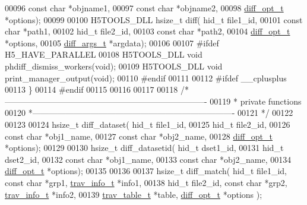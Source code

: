 \begin{DoxyCode}
00096                 \textcolor{keyword}{const} \textcolor{keywordtype}{char} *objname1,
00097                 \textcolor{keyword}{const} \textcolor{keywordtype}{char} *objname2,
00098                 \hyperlink{structdiff__opt__t}{diff\_opt\_t} *options);
00099 
00100 H5TOOLS\_DLL hsize\_t diff( hid\_t      file1\_id,
00101               \textcolor{keyword}{const} \textcolor{keywordtype}{char} *path1,
00102               hid\_t      file2\_id,
00103               \textcolor{keyword}{const} \textcolor{keywordtype}{char} *path2,
00104               \hyperlink{structdiff__opt__t}{diff\_opt\_t} *options,
00105               \hyperlink{structdiff__args__t}{diff\_args\_t} *argdata);
00106 
00107 \textcolor{preprocessor}{#ifdef H5\_HAVE\_PARALLEL}
00108 H5TOOLS\_DLL \textcolor{keywordtype}{void} phdiff\_dismiss\_workers(\textcolor{keywordtype}{void});
00109 H5TOOLS\_DLL \textcolor{keywordtype}{void} print\_manager\_output(\textcolor{keywordtype}{void});
00110 \textcolor{preprocessor}{#endif}
00111 
00112 \textcolor{preprocessor}{#ifdef \_\_cplusplus}
00113 \}
00114 \textcolor{preprocessor}{#endif}
00115 
00116 
00117 
00118 \textcolor{comment}{/*-------------------------------------------------------------------------}
00119 \textcolor{comment}{ * private functions}
00120 \textcolor{comment}{ *-------------------------------------------------------------------------}
00121 \textcolor{comment}{ */}
00122 
00123 
00124 hsize\_t diff\_dataset( hid\_t file1\_id,
00125                       hid\_t file2\_id,
00126                       \textcolor{keyword}{const} \textcolor{keywordtype}{char} *obj1\_name,
00127                       \textcolor{keyword}{const} \textcolor{keywordtype}{char} *obj2\_name,
00128                       \hyperlink{structdiff__opt__t}{diff\_opt\_t} *options);
00129 
00130 hsize\_t diff\_datasetid( hid\_t dset1\_id,
00131                         hid\_t dset2\_id,
00132                         \textcolor{keyword}{const} \textcolor{keywordtype}{char} *obj1\_name,
00133                         \textcolor{keyword}{const} \textcolor{keywordtype}{char} *obj2\_name,
00134                         \hyperlink{structdiff__opt__t}{diff\_opt\_t} *options);
00135 
00136 
00137 hsize\_t diff\_match( hid\_t file1\_id, \textcolor{keyword}{const} \textcolor{keywordtype}{char} *grp1, \hyperlink{structtrav__info__t}{trav\_info\_t} *info1,
00138                     hid\_t file2\_id, \textcolor{keyword}{const} \textcolor{keywordtype}{char} *grp2, \hyperlink{structtrav__info__t}{trav\_info\_t} *info2,
00139                     \hyperlink{structtrav__table__t}{trav\_table\_t} *table, \hyperlink{structdiff__opt__t}{diff\_opt\_t} *options );

\end{DoxyCode}
